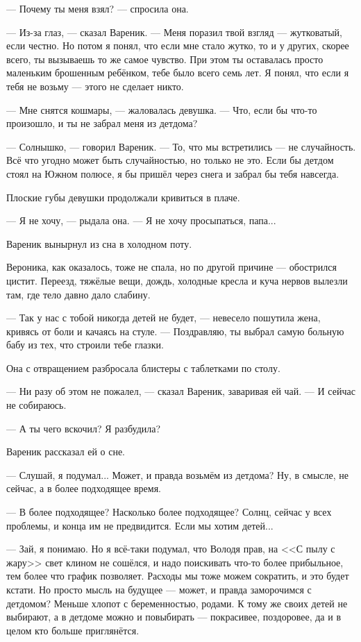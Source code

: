 --- Почему ты меня взял? --- спросила она.

--- Из-за глаз, --- сказал Вареник.
--- Меня поразил твой взгляд --- жутковатый, если честно.
Но потом я понял, что если мне стало жутко, то и у других, скорее всего, ты вызываешь то же самое чувство.
При этом ты оставалась просто маленьким брошенным ребёнком, тебе было всего семь лет.
Я понял, что если я тебя не возьму --- этого не сделает никто.

--- Мне снятся кошмары, --- жаловалась девушка.
--- Что, если бы что-то произошло, и ты не забрал меня из детдома?

--- Солнышко, --- говорил Вареник.
--- То, что мы встретились --- не случайность.
Всё что угодно может быть случайностью, но только не это.
Если бы детдом стоял на Южном полюсе, я бы пришёл через снега и забрал бы тебя навсегда.

Плоские губы девушки продолжали кривиться в плаче.

--- Я не хочу, --- рыдала она.
--- Я не хочу просыпаться, папа...

Вареник вынырнул из сна в холодном поту.

Вероника, как оказалось, тоже не спала, но по другой причине --- обострился цистит.
Переезд, тяжёлые вещи, дождь, холодные кресла и куча нервов вылезли там, где тело давно дало слабину.

--- Так у нас с тобой никогда детей не будет, --- невесело пошутила жена, кривясь от боли и качаясь на стуле.
--- Поздравляю, ты выбрал самую больную бабу из тех, что строили тебе глазки.

Она с отвращением разбросала блистеры с таблетками по столу.

--- Ни разу об этом не пожалел, --- сказал Вареник, заваривая ей чай.
--- И сейчас не собираюсь.

--- А ты чего вскочил?
Я разбудила?

Вареник рассказал ей о сне.

--- Слушай, я подумал...
Может, и правда возьмём из детдома?
Ну, в смысле, не сейчас, а в более подходящее время.

--- В более подходящее?
Насколько более подходящее?
Солнц, сейчас у всех проблемы, и конца им не предвидится.
Если мы хотим детей...

--- Зай, я понимаю.
Но я всё-таки подумал, что Володя прав, на <<С пылу с жару>> свет клином не сошёлся, и надо поискивать что-то более прибыльное, тем более что график позволяет.
Расходы мы тоже можем сократить, и это будет кстати.
Но просто мысль на будущее --- может, и правда заморочимся с детдомом?
Меньше хлопот с беременностью, родами.
К тому же своих детей не выбирают, а в детдоме можно и повыбирать --- покрасивее, поздоровее, да и в целом кто больше приглянётся.

